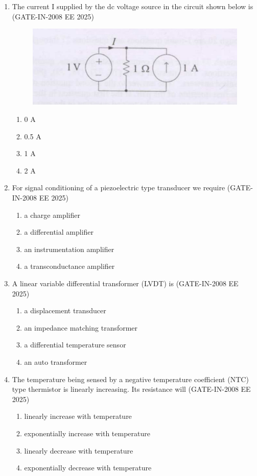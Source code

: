 \documentclass[journal,12pt,onecolumn]{IEEEtran}
\theoremstyle{remark}
\begin{document}
\begin{enumerate}[label=Q.\arabic*,start=1]
    \item  The current I supplied by the dc voltage source in the circuit shown below is (GATE-IN-2008 EE 2025)

 \begin{figure}[H]
    \centering
    \includegraphics[width=0.5\linewidth]{figs/i2.jpg}
    \label{fig:placeholder2}
\end{figure}
    \begin{enumerate} 
        \item  0 A
        \item  0.5 A
        \item  1 A
        \item  2 A
    \end{enumerate}
    
    \item For signal conditioning of a piezoelectric type transducer we require (GATE-IN-2008 EE 2025)
    \begin{enumerate} 
        \item a charge amplifier 
        \item  a differential amplifier
        \item  an instrumentation amplifier
        \item  a transconductance amplifier
    \end{enumerate}
    
    \item A linear variable differential transformer (LVDT) is (GATE-IN-2008 EE 2025)
    \begin{enumerate} 
        \item a displacement transducer 
        \item an impedance matching transformer
        \item a differential temperature sensor
        \item an auto transformer
    \end{enumerate}
    
    \item The temperature being sensed by a negative temperature coefficient (NTC) type thermistor is linearly increasing. Its resistance will (GATE-IN-2008 EE 2025)
    \begin{enumerate} 
        \item linearly increase with temperature
        \item exponentially increase with temperature 
        \item linearly decrease with temperature
        \item exponentially decrease with temperature
    \end{enumerate}
    

\end{enumerate}
\end{document}
